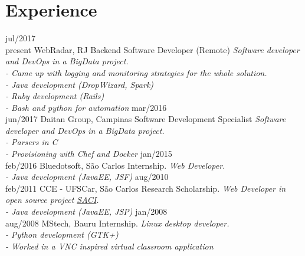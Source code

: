 \documentclass[]{friggeri-cv}
\begin{document}
\section{Experience}

\begin{entrylist}
  \entry
    {jul/2017\\present}
    {WebRadar, RJ}
    {Backend Software Developer (Remote)}
    {\emph{Software developer and DevOps in a BigData project.\\
	- Came up with logging and monitoring strategies for the whole solution.\\
    - Java development (DropWizard, Spark)\\
    - Ruby development (Rails)\\
    - Bash and python for automation}}
  \entry
    {mar/2016\\jun/2017}
    {Daitan Group, Campinas}
    {Software Development Specialist}
    {\emph{Software developer and DevOps in a BigData project.\\
    - Parsers in C\\
    - Provisioning with Chef and Docker}}
  \entry
    {jan/2015\\feb/2016}
    {Bluedotsoft, São Carlos}
    {Internship.}
    {\emph{Web Developer.\\
    - Java development (JavaEE, JSF)}}
  \entry
    {aug/2010\\feb/2011}
    {CCE - UFSCar, São Carlos}
    {Research Scholarship.}
    {\emph{Web Developer in open source project \href{http://www.saci-devel.ufscar.br}{SACI}.\\
    - Java development (JavaEE, JSP)}}
  \entry
    {jan/2008\\aug/2008}
    {MStech, Bauru}
    {Internship.}
    {\emph{Linux desktop developer.\\
    - Python development (GTK+) \\
    - Worked in a VNC inspired virtual classroom application}}
\end{entrylist}
\end{document}
